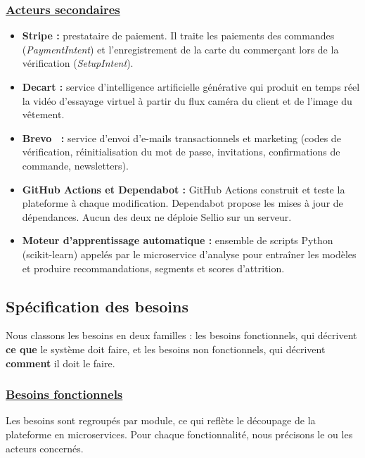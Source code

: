 \subsubsection*{\underline{\textbf{Acteurs secondaires}}}
\begin{itemize}[label=]
\item \textbf{Stripe :} prestataire de paiement. Il traite les paiements des commandes (\textit{PaymentIntent}) et l'enregistrement de la carte du commerçant lors de la vérification (\textit{SetupIntent}).
\item \textbf{Decart :} service d'intelligence artificielle générative qui produit en temps réel la vidéo d'essayage virtuel à partir du flux caméra du client et de l'image du vêtement.
\item \textbf{Brevo~\cite{brevo} :} service d'envoi d'e-mails transactionnels et marketing (codes de vérification, réinitialisation du mot de passe, invitations, confirmations de commande, newsletters).
\item \textbf{GitHub Actions et Dependabot :} GitHub Actions construit et teste la plateforme à chaque modification. Dependabot propose les mises à jour de dépendances. Aucun des deux ne déploie Sellio sur un serveur.
\item \textbf{Moteur d'apprentissage automatique :} ensemble de scripts Python (scikit-learn) appelés par le microservice d'analyse pour entraîner les modèles et produire recommandations, segments et scores d'attrition.
\end{itemize}

\subsection{Spécification des besoins}
Nous classons les besoins en deux familles : les besoins fonctionnels, qui décrivent \textbf{ce que} le système doit faire, et les besoins non fonctionnels, qui décrivent \textbf{comment} il doit le faire.
\subsubsection*{\underline{\textbf{Besoins fonctionnels}}}
Les besoins sont regroupés par module, ce qui reflète le découpage de la plateforme en microservices. Pour chaque fonctionnalité, nous précisons le ou les acteurs concernés.

